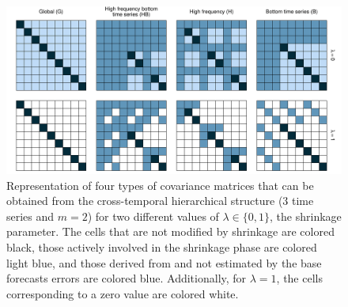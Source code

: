 \documentclass[a4paper,11pt]{article}
\theoremstyle{definition}
\begin{document}
\clearpage
\begin{figure}[!t]
	\centering
	\includegraphics[width = \linewidth]{fig/shr_cov/shr_color.pdf}
	\caption{Representation of four types of covariance matrices that can be obtained from the cross-temporal hierarchical structure ($3$ time series and $m = 2$) for two different values of $\lambda\in\{0,1\}$, the shrinkage parameter. The cells that are not modified by shrinkage are colored black, those actively involved in the shrinkage phase are colored light blue, and those derived from and not estimated by the base forecasts errors are colored blue. Additionally, for $\lambda = 1$, the cells corresponding to a zero value are colored white.}
	\label{fig:shr_grid}
\end{figure}
\end{document}
